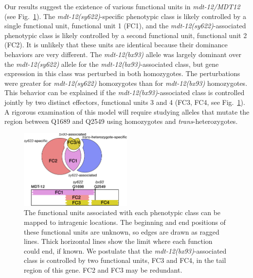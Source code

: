 \documentclass[8pt, twocolumn]{article}
\newcommand{\gene}[1]{\mbox{\emph{#1}}}
\newcommand{\dpy}[1]{\gene{mdt-12#1}}
\newcommand{\bx}{\dpy{(bx93)}}
\newcommand{\sy}{\dpy{(sy622)}}
\begin{document}
Our results suggest the existence of various functional units in \dpy{/MDT12}
(see Fig.~\ref{fig:domains}). The \sy{}-specific phenotypic class is likely
controlled by a single functional unit, functional unit 1 (FC1), and the
\sy{}-associated phenotypic class is likely controlled by a second
functional unit, functional unit 2 (FC2). It is unlikely that these units are
identical because their dominance behaviors are very different. The \bx{}
allele was largely dominant over the \sy{} allele for the
\bx{}-associated class, but gene expression in this class was perturbed in
both homozygotes. The perturbations were greater for \sy{} homozygotes
than for \bx{} homozygotes. This behavior can be explained if the
\bx{}-associated class is controlled jointly by two distinct effectors,
functional units 3 and 4 (FC3, FC4, see Fig.~\ref{fig:domains}). A rigorous
examination of this model will require studying alleles that mutate the region
between Q1689 and Q2549 using homozygotes and \emph{trans}-heterozygotes.


\begin{figure}
  \centering{}
  \includegraphics[width=0.5\textwidth]{../../figs/inferred_domains.pdf}
  \caption{
    The functional units associated with each phenotypic class can be
    mapped to intragenic locations. The beginning and end positions of
    these functional units are unknown,
    so edges are drawn as ragged lines. Thick horizontal lines show the
    limit where each function could end, if known. We postulate that the
    \bx{}-associated class is controlled by two functional units, FC3 and
    FC4, in the tail region of this gene. FC2 and FC3 may be redundant.
  }
\label{fig:domains}
\end{figure}
\end{document}
